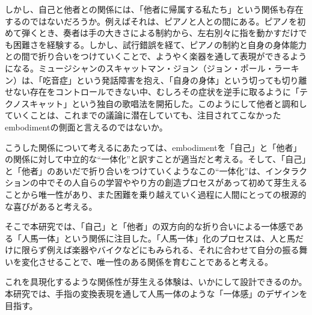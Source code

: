 
しかし、自己と他者との関係には、「他者に帰属する私たち」という関係も存在するのではないだろうか。例えばそれは、ピアノと人との間にある。ピアノを初めて弾くとき、奏者は手の大きさによる制約から、左右別々に指を動かすだけでも困難さを経験する。しかし、試行錯誤を経て、ピアノの制約と自身の身体能力との間で折り合いをつけていくことで、ようやく楽器を通して表現ができるようになる。ミュージシャンのスキャットマン・ジョン（ジョン・ポール・ラーキン）は、「吃音症」という発話障害を抱え、「自身の身体」という切っても切り離せない存在をコントロールできない中、むしろその症状を逆手に取るように「テクノスキャット」という独自の歌唱法を開拓した。このようにして他者と調和していくことは、これまでの議論に潜在していても、注目されてこなかったembodimentの側面と言えるのではないか。

こうした関係について考えるにあたっては、embodimentを「自己」と「他者」の関係に対して中立的な``一体化''と訳すことが適当だと考える。そして、「自己」と「他者」のあいだで折り合いをつけていくようなこの``一体化''は、インタラクションの中でその人自らの学習ややり方の創造プロセスがあって初めて芽生えることから唯一性があり、また困難を乗り越えていく過程に人間にとっての根源的な喜びがあると考える。

そこで本研究では、「自己」と「他者」の双方向的な折り合いによる一体感である「人馬一体」という関係に注目した。「人馬一体」化のプロセスは、人と馬だけに限らず例えば楽器やバイクなどにもみられる、それに合わせて自分の振る舞いを変化させることで、唯一性のある関係を育むことであると考える。

これを具現化するような関係性が芽生える体験は、いかにして設計できるのか。本研究では、手指の変換表現を通して人馬一体のような「一体感」のデザインを目指す。




